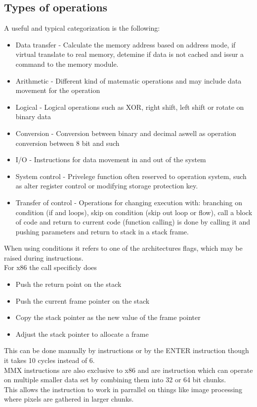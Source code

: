 \documentclass[12pt, a4paper]{article}
\begin{document}
		\subsection{Types of operations}
			A useful and typical categorization is the following: 
			\begin{itemize}
				\item Data transfer - Calculate the memory address based on address mode, if virtual translate to real memory, detemine if data is not cached and issur a command to the memory module.
				\item Arithmetic - Different kind of matematic operations and may include data movement for the operation
				\item Logical - Logical operations such as XOR, right shift, left shift or rotate on binary data
				\item Conversion - Conversion between binary and decimal aswell as operation conversion between 8 bit and such
				\item I/O - Instructions for data movement in and out of the system
				\item System control - Privelege function often reserved to operation system, such as alter register control or modifying storage protection key.
				\item Transfer of control - Operations for changing execution with: branching on condition (if and loops), skip on condition (skip out loop or flow), call a block of code and return to current code (function calling) is done by calling it and pushing parameters and return to stack in a stack frame. 
			\end{itemize}
			When using conditions it refers to one of the architectures flags, which may be raised during instructions.\\
			For x86 the call specificly does
			\begin{itemize}
				\item Push the return point on the stack
				\item Push the current frame pointer on the stack
				\item Copy the stack pointer as the new value of the frame pointer
				\item Adjust the stack pointer to allocate a frame
			\end{itemize}
			This can be done manually by instructions or by the ENTER instruction though it takes 10 cycles instead of 6.\\
			MMX instructions are also exclusive to x86 and are instruction which can operate on multiple smaller data set by combining them into 32 or 64 bit chunks.\\
			This allows the instruction to work in parrallel on things like image processing where pixels are gathered in larger chunks.\\
\end{document}
